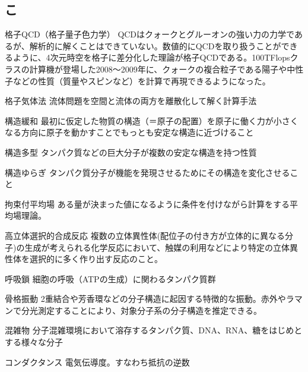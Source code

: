 \begin{用語集}
\section{こ}
\item{格子QCD（格子量子色力学）}{}
{QCDはクォークとグルーオンの強い力の力学であるが、解析的に解くことはできていない。数値的にQCDを取り扱うことができるように、4次元時空を格子に差分化した理論が格子QCDである。100TFlopsクラスの計算機が登場した2008～2009年に、クォークの複合粒子である陽子や中性子などの性質（質量やスピンなど）を計算で再現できるようになった。}
\item{格子気体法}{}
{流体問題を空間と流体の両方を離散化して解く計算手法}
\item{構造緩和}{}
{最初に仮定した物質の構造（＝原子の配置）を原子に働く力が小さくなる方向に原子を動かすことでもっとも安定な構造に近づけること}
\item{構造多型}{}
{タンパク質などの巨大分子が複数の安定な構造を持つ性質}
\item{構造ゆらぎ}{}
{タンパク質分子が機能を発現させるためにその構造を変化させること}
\item{拘束付平均場}{}
{ある量が決まった値になるように条件を付けながら計算をする平均場理論。}
\item{高立体選択的合成反応}{}
{複数の立体異性体(配位子の付き方が立体的に異なる分子)の生成が考えられる化学反応において、触媒の利用などにより特定の立体異性体を選択的に多く作り出す反応のこと。}
\item{呼吸鎖}{}
{細胞の呼吸（ATPの生成）に関わるタンパク質群}
\item{骨格振動}{}
{2重結合や芳香環などの分子構造に起因する特徴的な振動。赤外やラマンで分光測定することにより、対象分子系の分子構造を推定できる。}
\item{混雑物}{}
{分子混雑環境において溶存するタンパク質、DNA、RNA、糖をはじめとする様々な分子}
\item{コンダクタンス}{}
{電気伝導度。すなわち抵抗の逆数}

\end{用語集}
